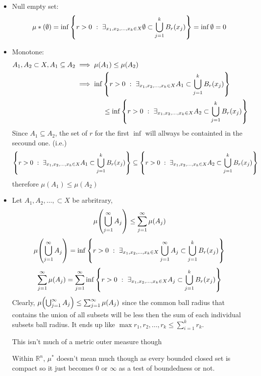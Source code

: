 \documentclass[]{article}
\newcommand{\R}{\mathbb{R}}
\newcommand{\st}{\ : \ }
\begin{document}
\begin{itemize}
    \item Null empty set: \[
        \mu*(\emptyset) = \inf\qty{
            r > 0 \st \exists_{x_1,x_2,\dots,x_k \in X} \emptyset \subset \bigcup_{j=1}^{k} B_r(x_j)
        } =        
        \inf{\emptyset} = 0
    \]
    \item Monotone: %
    \begin{align*}
        A_1,A_2 \subset X, A_1 \subseteq A_2 &\implies \mu(A_1) \leq \mu(A_2)\\
        &\implies \inf\qty{
            r > 0 \st \exists_{x_1,x_2,\dots,x_k \in X} A_1 \subset \bigcup_{j=1}^{k} B_r(x_j)
        } 
        \\ &\qquad \qquad \leq \inf\qty{
            r > 0 \st \exists_{x_1,x_2,\dots,x_k \in X} A_2 \subset \bigcup_{j=1}^{k} B_r(x_j)
        }
    \end{align*}
    Since $A_1 \subseteq A_2$, the set of $r$ for the first $\inf$ will allways be containted in the secound one.
    (i.e.)\[
        \qty{
            r > 0 \st \exists_{x_1,x_2,\dots,x_k \in X} A_1 \subset \bigcup_{j=1}^{k} B_r(x_j)
        } \subseteq \qty{
            r > 0 \st \exists_{x_1,x_2,\dots,x_k \in X} A_2 \subset \bigcup_{j=1}^{k} B_r(x_j)
        }
    \] therefore $\mu(A_1) \leq \mu(A_2)$
    
    \item %
    Let $A_1,A_2,\dots,\subset X$ be arbritrary, \[
        \mu \qty(\bigcup_{j=1}^{\infty} A_j) \leq \sum_{j=1}^{\infty} \mu(A_j)
    \]\[
        \mu \qty(\bigcup_{j=1}^{\infty} A_j) =
        \inf\qty{
            r > 0 \st \exists_{x_1,x_2,\dots,x_k \in X} \bigcup_{j=1}^{\infty} A_j \subset \bigcup_{j=1}^{k} B_r(x_j)
        }
    \]\[
        \sum_{j=1}^{\infty} \mu(A_j) = 
        \sum_{j=1}^{\infty} \inf\qty{
            r > 0 \st \exists_{x_1,x_2,\dots,x_k \in X} A_j \subset \bigcup_{j=1}^{k} B_r(x_j)
        }
    \] Clearly, $\mu \qty(\bigcup_{j=1}^{\infty} A_j) \leq \sum_{j=1}^{\infty} \mu(A_j)$ since the common ball radius that contains the union of all subsets will be less then the sum of each individual subsets ball radius. 
    It ends up like $\max{r_1,r_2,\dots,r_k} \leq \sum_{i=1}^{k} r_k$.

    This isn't much of a metric outer measure though

    Within $\R^n$, $\mu^*$ doesn't mean much though as every bounded closed set is compact so it just becomes $0$ or $\infty$ as a test of boundedness or not.
\end{itemize}
\end{document}
